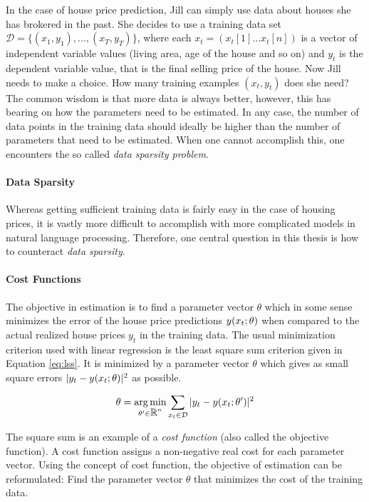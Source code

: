 In the case of house price prediction, Jill can simply use data about
houses she has brokered in the past. She decides to use a training
data set $\mathcal{D} = \{(x_1, y_1), ..., (x_T, y_T)\}$, where each
$x_t = (x_t[1] ... x_t[n])$ is a vector of independent variable values
(living area, age of the house and so on) and $y_t$ is the dependent
variable value, that is the final selling price of the house. Now Jill
needs to make a choice. How many training examples $(x_t, y_t)$ does
she need? The common wisdom is that more data is always better,
however, this has bearing on how the parameters need to be
estimated. In any case, the number of data points in the training data
should ideally be higher than the number of parameters that need to be
estimated. When one cannot accomplish this, one encounters the so
called {\it data sparsity problem}.

\paragraph{Data Sparsity} Whereas getting sufficient training data is
fairly easy in the case of housing prices, it is vastly more difficult
to accomplish with more complicated models in natural language
processing. Therefore, one central question in this thesis is how to
counteract {\it data sparsity}.

\paragraph{Cost Functions} The objective in estimation is to find a
parameter vector $\theta$ which in some sense minimizes the error of
the house price predictions $y(x_t\mbox{$ ; \, $} \theta)$ when compared to
the actual realized house prices $y_t$ in the training data. The usual
minimization criterion used with linear regression is the least square
sum criterion given in Equation \ref{eq:lss}. It is minimized by a
parameter vector $\theta$ which gives as small square errors $|y_t -
y(x_t \mbox{$ ; \, $} \theta)|^2$ as possible.

\begin{equation}
\theta = \operatorname*{arg\,min}_{\theta' \in \mbox{$\mathbb R$}^n} \sum_{x_t \in \mathcal{D}} | y_t - y(x_t\mbox{$ ; \, $} \theta')|^2\label{eq:lss}
\end{equation}

The square sum is an example of a {\it cost function} (also
called the objective function). A cost function assigns a non-negative
real cost for each parameter vector. Using the concept of cost
function, the objective of estimation can be reformulated: Find the
parameter vector $\theta$ that minimizes the cost of the training
data.

